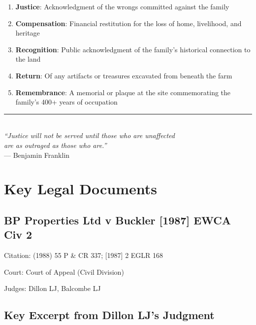 \documentclass[11pt,a4paper]{article}
\begin{document}
\begin{tcolorbox}[colback=gold!10,colframe=gold!70!black,title=\textbf{The Buckler Family's Request}]
\begin{enumerate}[label=\arabic*.]
    \item \textbf{Justice}: Acknowledgment of the wrongs committed against the family
    \item \textbf{Compensation}: Financial restitution for the loss of home, livelihood, and heritage
    \item \textbf{Recognition}: Public acknowledgment of the family's historical connection to the land
    \item \textbf{Return}: Of any artifacts or treasures excavated from beneath the farm
    \item \textbf{Remembrance}: A memorial or plaque at the site commemorating the family's 400+ years of occupation
\end{enumerate}
\end{tcolorbox}

\vspace{1cm}

\begin{center}
\rule{0.6\textwidth}{0.5pt}\\[0.5cm]
{\large\itshape ``Justice will not be served until those who are unaffected\\
are as outraged as those who are.''}\\[0.3cm]
--- Benjamin Franklin
\end{center}

\newpage

\appendix

\section{Key Legal Documents}

\subsection{BP Properties Ltd v Buckler [1987] EWCA Civ 2}

Citation: (1988) 55 P \& CR 337; [1987] 2 EGLR 168

Court: Court of Appeal (Civil Division)

Judges: Dillon LJ, Balcombe LJ

\subsection{Key Excerpt from Dillon LJ's Judgment}
\end{document}
